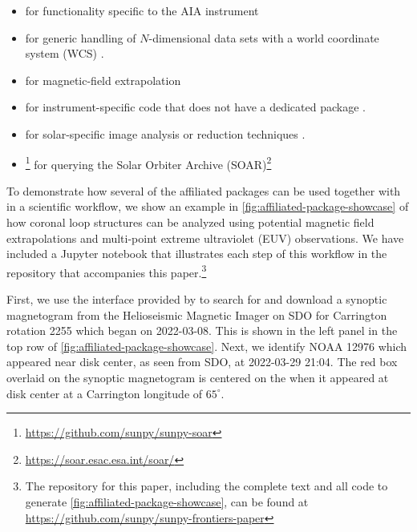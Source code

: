 \begin{itemize}
    \item \aiapypkg for functionality specific to the AIA instrument \citep{barnes_aiapy_2020}
    \item {} for generic handling of $N$-dimensional data sets with a world coordinate system (WCS) \citep{danryanirish_2021_5715161}.
    \item {} for magnetic-field extrapolation \citep{stansby_pfsspy_2020}
    \item {} for instrument-specific code that does not have a dedicated package \citep{danryanirish_2022_7190661}.
    \item {} for solar-specific image analysis or reduction techniques \citep{nabil_freij_2022_6578722}.
    \item {}\footnote{\url{https://github.com/sunpy/sunpy-soar}} for querying the Solar Orbiter Archive (SOAR)\footnote{\url{https://soar.esac.esa.int/soar/}}
\end{itemize}

To demonstrate how several of the affiliated packages can be used together with \sunpypkg in a scientific workflow, we show an example in \autoref{fig:affiliated-package-showcase} of how coronal loop structures can be analyzed using potential magnetic field extrapolations and multi-point extreme ultraviolet (EUV) observations.
We have included a Jupyter notebook that illustrates each step of this workflow in the \github repository that accompanies this paper.\footnote{The \github repository for this paper, including the complete text and all code to generate \autoref{fig:affiliated-package-showcase}, can be found at \url{https://github.com/sunpy/sunpy-frontiers-paper}}

First, we use the \Fido interface provided by \sunpypkg to search for and download a synoptic magnetogram from the Helioseismic Magnetic Imager \citep[HMI,][]{scherrer_helioseismic_2012} on SDO for Carrington rotation 2255 which began on 2022-03-08.
This is shown in the left panel in the top row of \autoref{fig:affiliated-package-showcase}.
Next, we identify \AR NOAA 12976 which appeared near disk center, as seen from SDO, at 2022-03-29 21:04.
The red box overlaid on the synoptic magnetogram is centered on the \AR when it appeared at disk center at a Carrington longitude of $65^\circ$.

